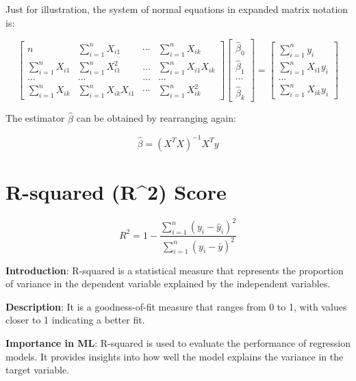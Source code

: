 \documentclass[
  12 pt,
  a4paper,
]{book}
\numberwithin{equation}{section}
\theoremstyle{plain}      %
\theoremstyle{definition} %
\theoremstyle{remark}     %
\theoremstyle{note}         %
\begin{document}
Just for illustration, the system of normal equations in expanded matrix
notation is:

\[
\left[\begin{array}{cccc}
n & \sum_{i=1}^{n} X_{i 1} & \cdots & \sum_{i=1}^{n} X_{i k} \\
\sum_{i=1}^{n} X_{i 1} & \sum_{i=1}^{n} X_{i 1}^{2} & \ldots & \sum_{i=1}^{n} X_{i 1} X_{i k} \\
\ldots & \ldots & \ldots & \ldots \\
\sum_{i=1}^{n} X_{i k} & \sum_{i=1}^{n} X_{i k} X_{i 1} & \cdots & \sum_{i=1}^{n} X_{i k}^{2}
\end{array}\right]\left[\begin{array}{c}
\hat{\beta}_{0} \\
\hat{\beta}_{1} \\
\cdots \\
\hat{\beta}_{k}
\end{array}\right]=\left[\begin{array}{c}
\sum_{i=1}^{n} y_{i} \\
\sum_{i=1}^{n} X_{i 1} y_{i} \\
\ldots \\
\sum_{i=1}^{n} X_{i k} y_{i}
\end{array}\right]
\]

The estimator \(\hat{\beta}\) can be obtained by rearranging again:

\[
\hat{\beta}=\left(X^{T} X\right)^{-1} X^{T} y
\]

\newpage

\hypertarget{r-squared-r2-score}{%
\chapter{R-squared (R\^{}2) Score}\label{r-squared-r2-score}}

\[
R^2 = 1 - \frac{\sum_{i=1}^n (y_i - \hat{y}_i)^2}{\sum_{i=1}^n (y_i - \bar{y})^2}
\]

\textbf{Introduction}: R-squared is a statistical measure that
represents the proportion of variance in the dependent variable
explained by the independent variables.

\textbf{Description}: It is a goodness-of-fit measure that ranges from 0
to 1, with values closer to 1 indicating a better fit.

\textbf{Importance in ML}: R-squared is used to evaluate the performance
of regression models. It provides insights into how well the model
explains the variance in the target variable.
\end{document}
